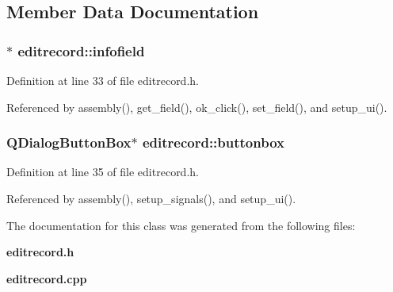 \subsection{Member Data Documentation}
\subsubsection{$\ast$ {\bf editrecord::infofield}\hspace{0.3cm}{\tt  [private]}}\label{classeditrecord_0f1df1474362ce3fb91219279aad9c3c}




Definition at line 33 of file editrecord.h.

Referenced by assembly(), get\_\-field(), ok\_\-click(), set\_\-field(), and setup\_\-ui().
\subsubsection{\setlength{\rightskip}{0pt plus 5cm}QDialog\-Button\-Box$\ast$ {\bf editrecord::buttonbox}\hspace{0.3cm}{\tt  [private]}}\label{classeditrecord_fd6ed719dfca0229e45aadbac28eff6b}




Definition at line 35 of file editrecord.h.

Referenced by assembly(), setup\_\-signals(), and setup\_\-ui().

The documentation for this class was generated from the following files:\begin{CompactItemize}
\item 
{\bf editrecord.h}\item 
{\bf editrecord.cpp}\end{CompactItemize}

